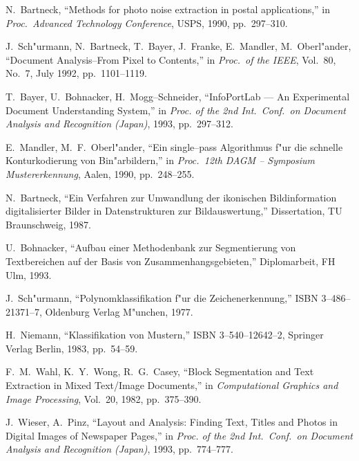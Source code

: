 \begin{thebibliography}{9999}

 N.~Bartneck, "`Methods for photo noise extraction
  in postal applications,"' in {\em Proc.~Advanced Technology
  Conference}, USPS, 1990, pp.~297--310.

 J.~Sch"urmann, N.~Bartneck, T.~Bayer,
  J.\ Franke, E.\ Mandler, M.\ Oberl"ander, "`Document Analysis--From
  Pixel to Contents,"' in {\em Proc.~of the IEEE}, Vol.~80, No.~7,
  July 1992, pp.~1101--1119.
  
 T.~Bayer, U.~Bohnacker, H.~Mogg--Schneider,
  "`InfoPortLab --- An Experimental Document Understanding System,"' in
  {\em Proc. of the 2nd Int.~Conf.~on Document Analysis and
    Recognition (Japan)}, 1993, pp.~297--312.

 E.~Mandler, M.~F.~Oberl"ander, "`Ein single--pass
  Algorithmus f"ur die schnelle Konturkodierung von Bin"arbildern,"' in
  {\em Proc.~12th DAGM -- Symposium Mustererkennung}, Aalen, 1990, pp.~248--255.
  
 N.~Bartneck, "`Ein Verfahren zur Umwandlung der
  ikonischen Bildinformation digitalisierter Bilder in Datenstrukturen
  zur Bildauswertung,"' Dissertation, TU Braunschweig, 1987.
  
 U.~Bohnacker, "`Aufbau einer Methodenbank zur
  Segmentierung von Textbereichen auf der Basis von
  Zusammenhangsgebieten,"' Diplomarbeit, FH Ulm, 1993.
  
 J.~Sch"urmann, "`Polynomklassifikation f"ur die
  Zeichenerkennung,"' ISBN 3--486--21371--7, Oldenburg Verlag
  M"unchen, 1977.
  
 H.~Niemann, "`Klassifikation von Mustern,"'
  ISBN 3--540--12642--2, Springer Verlag Berlin, 1983, pp.~54--59.

 F.~M.~Wahl, K.~Y.~Wong, R.~G.~Casey, "`Block
  Segmentation and Text Extraction in Mixed Text/Image Documents,"' in
  {\em Computational Graphics and Image Processing}, Vol.~20, 1982,
  pp.~375--390.
  
 J.~Wieser, A.~Pinz, "`Layout and Analysis: Finding
  Text, Titles and Photos in Digital Images of Newspaper Pages,"' in
  {\em Proc. of the 2nd Int.~Conf.~on Document Analysis and
    Recognition (Japan)}, 1993, pp.~774--777.
  

\end{thebibliography}
